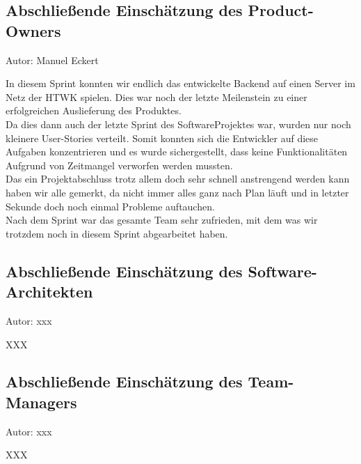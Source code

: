 \subsection{Abschließende Einschätzung des Product-Owners}
{\small Autor: Manuel Eckert}

In diesem Sprint konnten wir endlich das entwickelte Backend auf einen Server im Netz der HTWK spielen. Dies war noch der letzte Meilenstein zu einer erfolgreichen Auslieferung des Produktes. \\
Da dies dann auch der letzte Sprint des SoftwareProjektes war, wurden nur noch kleinere User-Stories verteilt. Somit konnten sich die Entwickler auf diese Aufgaben konzentrieren und es wurde sichergestellt, dass keine Funktionalitäten Aufgrund von Zeitmangel verworfen werden mussten. \\
Das ein Projektabschluss trotz allem doch sehr schnell anstrengend werden kann haben wir alle gemerkt, da nicht immer alles ganz nach Plan läuft und in letzter Sekunde doch noch einmal Probleme auftauchen. \\
Nach dem Sprint war das gesamte Team sehr zufrieden, mit dem was wir trotzdem noch in diesem Sprint abgearbeitet haben. 

\subsection{Abschließende Einschätzung des Software-Architekten}
{\small Autor: xxx}

XXX

\subsection{Abschließende Einschätzung des Team-Managers}
{\small Autor: xxx}

XXX